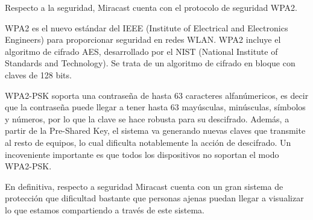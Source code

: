 
Respecto a la seguridad, Miracast cuenta con el protocolo de seguridad WPA2.

WPA2 es el nuevo estándar del IEEE (Institute of Electrical and Electronics Engineers) para proporcionar seguridad en redes WLAN. WPA2 incluye el algoritmo de cifrado AES, desarrollado por el NIST (National Institute of Standards and Technology). Se trata de un algoritmo de cifrado en bloque con claves de 128 bits.

WPA2-PSK soporta una contraseña de hasta 63 caracteres alfanúmericos, es decir que la contraseña puede llegar a tener hasta 63 mayúsculas, minúsculas, símbolos y números, por lo que la clave se hace robusta para su descifrado. Además, a partir de la Pre-Shared Key, el sistema va generando nuevas claves que transmite al resto de equipos, lo cual dificulta notablemente la acción de descifrado. Un incoveniente importante es que todos los dispositivos no soportan el modo WPA2-PSK.

En definitiva, respecto a seguridad Miracast cuenta con un gran sistema de protección que dificultad bastante que personas ajenas puedan llegar a visualizar lo que estamos compartiendo a través de este sistema.
